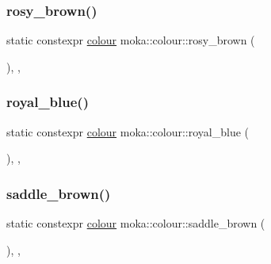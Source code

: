 \mbox{\label{classmoka_1_1colour_a7d35dcc77038c5ee24eb2d5f7bc7d071}} 
\subsubsection{\texorpdfstring{rosy\_brown()}{rosy\_brown()}}
{\footnotesize\ttfamily static constexpr \mbox{\hyperlink{classmoka_1_1colour}{colour}} moka\+::colour\+::rosy\+\_\+brown (\begin{DoxyParamCaption}{ }\end{DoxyParamCaption})\hspace{0.3cm}{\ttfamily [inline]}, {\ttfamily [static]}, {\ttfamily [noexcept]}}

\mbox{\label{classmoka_1_1colour_a01e8353c6398f3b4348cdf1b30dd3ca4}} 
\subsubsection{\texorpdfstring{royal\_blue()}{royal\_blue()}}
{\footnotesize\ttfamily static constexpr \mbox{\hyperlink{classmoka_1_1colour}{colour}} moka\+::colour\+::royal\+\_\+blue (\begin{DoxyParamCaption}{ }\end{DoxyParamCaption})\hspace{0.3cm}{\ttfamily [inline]}, {\ttfamily [static]}, {\ttfamily [noexcept]}}

\mbox{\label{classmoka_1_1colour_a3325d3ab6ddcba8bfd756ddadab901f9}} 
\subsubsection{\texorpdfstring{saddle\_brown()}{saddle\_brown()}}
{\footnotesize\ttfamily static constexpr \mbox{\hyperlink{classmoka_1_1colour}{colour}} moka\+::colour\+::saddle\+\_\+brown (\begin{DoxyParamCaption}{ }\end{DoxyParamCaption})\hspace{0.3cm}{\ttfamily [inline]}, {\ttfamily [static]}, {\ttfamily [noexcept]}}

